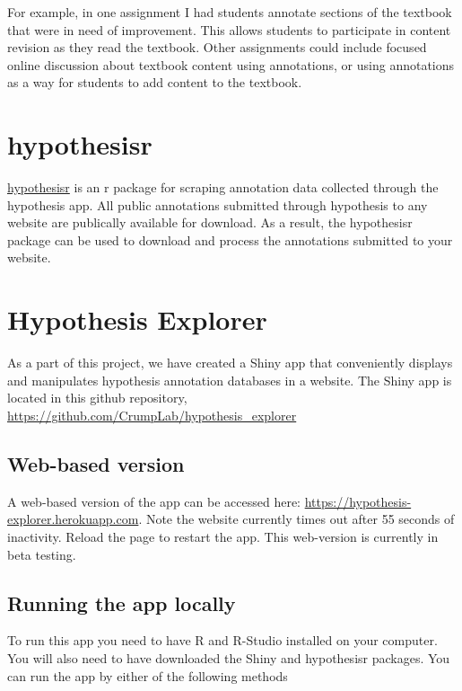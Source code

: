 \documentclass[]{book}
\theoremstyle{definition}
\theoremstyle{definition}
\theoremstyle{definition}
\theoremstyle{remark}
\begin{document}
For example, in one assignment I had students annotate sections of the
textbook that were in need of improvement. This allows students to
participate in content revision as they read the textbook. Other
assignments could include focused online discussion about textbook
content using annotations, or using annotations as a way for students to
add content to the textbook.

\section{hypothesisr}\label{hypothesisr-1}

\href{https://github.com/mdlincoln/hypothesisr}{hypothesisr} is an r
package for scraping annotation data collected through the hypothesis
app. All public annotations submitted through hypothesis to any website
are publically available for download. As a result, the hypothesisr
package can be used to download and process the annotations submitted to
your website.

\section{Hypothesis Explorer}\label{hypothesis-explorer}

As a part of this project, we have created a Shiny app that conveniently
displays and manipulates hypothesis annotation databases in a website.
The Shiny app is located in this github repository,
\url{https://github.com/CrumpLab/hypothesis_explorer}

\subsection{Web-based version}\label{web-based-version}

A web-based version of the app can be accessed here:
\url{https://hypothesis-explorer.herokuapp.com}. Note the website
currently times out after 55 seconds of inactivity. Reload the page to
restart the app. This web-version is currently in beta testing.

\subsection{Running the app locally}\label{running-the-app-locally}

To run this app you need to have R and R-Studio installed on your
computer. You will also need to have downloaded the Shiny and
hypothesisr packages. You can run the app by either of the following
methods
\end{document}
